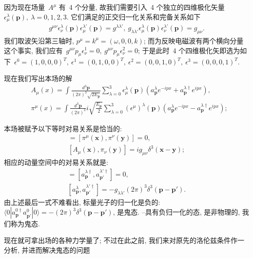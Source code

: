 因为现在场量~$A^\mu$ 有~4 个分量, 故我们需要引入~4 个独立的四维极化矢量~$\epsilon^\lambda_\mu(\bm{p}),~\lambda=0,1,2,3$. 它们满足的正交归一化关系和完备关系如下
\begin{align}
g^{\mu\nu}\epsilon^\lambda_\nu(\bm{p})\epsilon^{\lambda'}_\mu(\bm{p})=g^{\lambda\lambda'},~g_{\lambda\lambda'}\epsilon^\lambda_\mu(\bm{p})\epsilon^{\lambda'}_\nu(\bm{p})=g_{\mu\nu}.
\end{align}
我们取波矢沿第三轴时, $p^\mu=k^\mu=(\omega,0,0,k)$; 而为反映电磁波有两个横向分量这个事实, 我们应有~$g^{\mu\nu}p_\mu\epsilon^1_\nu=0,~g^{\mu\nu}p_\mu\epsilon^2_\nu=0$; 于是此时~4 个四维极化矢即选为如下~$\epsilon^0=(1,0,0,0)^T,~\epsilon^1=(0,1,0,0)^T,~\epsilon^2=(0,0,1,0)^T,~\epsilon^3=(0,0,0,1)^T$.

现在我们写出本场的解
\begin{align}
&A_\mu(x)=\int\frac{d^3\bm{p}}{(2\pi)^3\sqrt{2E_{\bm{p}}}}\sum_{\lambda=0}^3\epsilon^\lambda_\mu(\bm{p})\left(a^\lambda_{\bm{p}}e^{-ipx}+a^{\lambda\dag}_{\bm{p}}e^{ipx}\right),\\
&\pi^\mu(x)=\int\frac{d^3\bm{p}}{(2\pi)^3}i\sqrt{\frac{E_{\bm{p}}}{2}}\sum_{\lambda=0}^3(\epsilon^\mu)^\lambda(\bm{p})\left(a^\lambda_{\bm{p}}e^{-ipx}-a^{\lambda\dag}_{\bm{p}}e^{ipx}\right);
\end{align}


本场被赋予以下等时对易关系是恰当的:
\begin{gather}
[A_\mu(\bm{x}),A_\nu(\bm{y})]=[\pi^\mu(\bm{x}),\pi^\nu(\bm{y})]=0,\\
[A_\mu(\bm{x}),\pi_\nu(\bm{y})]=ig_{\mu\nu}\delta^3(\bm{x}-\bm{y});
\end{gather}
相应的动量空间中的对易关系就是:
\begin{gather}
[a_{\bm{p}}^\lambda,a_{\bm{p}'}^{\lambda'}]=[a_{\bm{p}}^{\lambda\dag},a_{\bm{p}'}^{\lambda'\dag}]=0,\\
[a_{\bm{p}}^\lambda,a_{\bm{p}'}^{\lambda'\dag}]=-g_{\lambda\lambda'}(2\pi)^3\delta^3(\bm{p}-\bm{p}').
\end{gather}
由上述最后一式不难看出, 标量光子的归一化是负的: $\langle0|a^{0\dag}_{\bm{p}}a^0_{\bm{p}'}|0\rangle=-(2\pi)^3\delta^3(\bm{p}-\bm{p}')$, 是鬼态. --具有负归一化的态, 是非物理的, 我们称为鬼态.

现在就可拿出场的各种力学量了; 不过在此之前, 我们来对原先的洛伦兹条件作一分析, 并进而解决鬼态的问题



